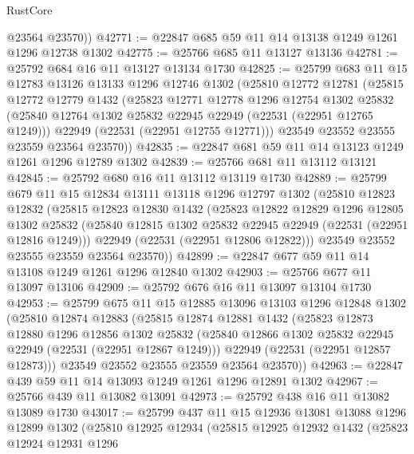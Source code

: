\begin{lexlean}{RustCore}
\begin{coremodule}
        @23564
        @23570))
@42771 := @22847 @685 @59 @11 @14 @13138 @1249 @1261 @1296 @12738 @1302
@42775 := @25766 @685 @11 @13127 @13136
@42781 := @25792 @684 @16 @11 @13127 @13134 @1730
@42825 := @25799
    @683
    @11
    @15
    @12783
    @13126
    @13133
    @1296
    @12746
    @1302
    (@25810
      @12772
      @12781
      (@25815
        @12772
        @12779
        @1432
        (@25823
          @12771
          @12778
          @1296
          @12754
          @1302
          @25832
          (@25840 @12764 @1302 @25832 @22945 @22949 (@22531 (@22951 @12765 @1249)))
          @22949
          (@22531 (@22951 @12755 @12771)))
        @23549
        @23552
        @23555
        @23559
        @23564
        @23570))
@42835 := @22847 @681 @59 @11 @14 @13123 @1249 @1261 @1296 @12789 @1302
@42839 := @25766 @681 @11 @13112 @13121
@42845 := @25792 @680 @16 @11 @13112 @13119 @1730
@42889 := @25799
    @679
    @11
    @15
    @12834
    @13111
    @13118
    @1296
    @12797
    @1302
    (@25810
      @12823
      @12832
      (@25815
        @12823
        @12830
        @1432
        (@25823
          @12822
          @12829
          @1296
          @12805
          @1302
          @25832
          (@25840 @12815 @1302 @25832 @22945 @22949 (@22531 (@22951 @12816 @1249)))
          @22949
          (@22531 (@22951 @12806 @12822)))
        @23549
        @23552
        @23555
        @23559
        @23564
        @23570))
@42899 := @22847 @677 @59 @11 @14 @13108 @1249 @1261 @1296 @12840 @1302
@42903 := @25766 @677 @11 @13097 @13106
@42909 := @25792 @676 @16 @11 @13097 @13104 @1730
@42953 := @25799
    @675
    @11
    @15
    @12885
    @13096
    @13103
    @1296
    @12848
    @1302
    (@25810
      @12874
      @12883
      (@25815
        @12874
        @12881
        @1432
        (@25823
          @12873
          @12880
          @1296
          @12856
          @1302
          @25832
          (@25840 @12866 @1302 @25832 @22945 @22949 (@22531 (@22951 @12867 @1249)))
          @22949
          (@22531 (@22951 @12857 @12873)))
        @23549
        @23552
        @23555
        @23559
        @23564
        @23570))
@42963 := @22847 @439 @59 @11 @14 @13093 @1249 @1261 @1296 @12891 @1302
@42967 := @25766 @439 @11 @13082 @13091
@42973 := @25792 @438 @16 @11 @13082 @13089 @1730
@43017 := @25799
    @437
    @11
    @15
    @12936
    @13081
    @13088
    @1296
    @12899
    @1302
    (@25810
      @12925
      @12934
      (@25815
        @12925
        @12932
        @1432
        (@25823
          @12924
          @12931
          @1296

\end{coremodule}
\end{lexlean}
